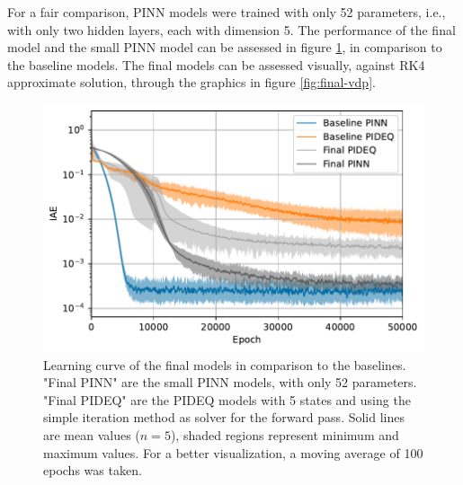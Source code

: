 For a fair comparison, \gls{PINN} models were trained with only 52 parameters, i.e., with only two hidden layers, each with dimension 5.
The performance of the final model and the small \gls{PINN} model can be assessed in figure \ref{fig:final-iae}, in comparison to the baseline models. The final models can be assessed visually, against \gls{RK4} approximate solution, through the graphics in figure \ref{fig:final-vdp}.

\begin{figure}[h]
    \centering
    \includegraphics{images/final_iae.pdf}
    \caption{Learning curve of the final models in comparison to the baselines. "Final PINN" are the small \gls{PINN} models, with only 52 parameters. "Final PIDEQ" are the \gls{PIDEQ} models with 5 states and using the simple iteration method as solver for the forward pass. Solid lines are mean values ($n=5$), shaded regions represent minimum and maximum values. For a better visualization, a moving average of 100 epochs was taken.}
    \label{fig:final-iae}
\end{figure}

